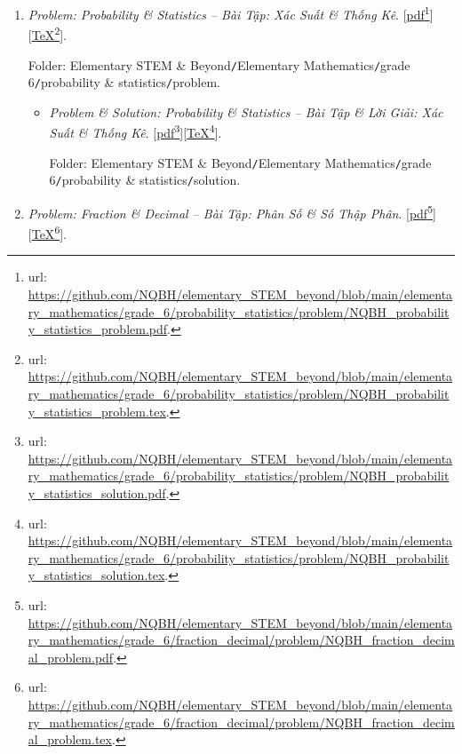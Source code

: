 \documentclass[12pt,twoside]{book}
\begin{document}
\begin{enumerate}
\begin{itemize}
		Folder: {\sf Elementary STEM \& Beyond{\tt/}Elementary Mathematics{\tt/}grade 6{\tt/}visual geometry{\tt/}solution}.
	\end{itemize}
	\item {\it Problem: Probability {\it\&} Statistics -- Bài Tập: Xác Suất {\it\&} Thống Kê}. [\href{https://github.com/NQBH/elementary_STEM_beyond/blob/main/elementary_mathematics/grade_6/probability_statistics/problem/NQBH_probability_statistics_problem.pdf}{pdf}\footnote{{\sc url}: \url{https://github.com/NQBH/elementary_STEM_beyond/blob/main/elementary_mathematics/grade_6/probability_statistics/problem/NQBH_probability_statistics_problem.pdf}.}][\href{https://github.com/NQBH/elementary_STEM_beyond/blob/main/elementary_mathematics/grade_6/probability_statistics/problem/NQBH_probability_statistics_problem.tex}{\TeX}\footnote{{\sc url}: \url{https://github.com/NQBH/elementary_STEM_beyond/blob/main/elementary_mathematics/grade_6/probability_statistics/problem/NQBH_probability_statistics_problem.tex}.}].
	
	Folder: {\sf Elementary STEM \& Beyond{\tt/}Elementary Mathematics{\tt/}grade 6{\tt/}probability \& statistics{\tt/}problem}.
	\begin{itemize}
		\item {\it Problem \& Solution: Probability {\it\&} Statistics -- Bài Tập \& Lời Giải: Xác Suất {\it\&} Thống Kê}. [\href{https://github.com/NQBH/elementary_STEM_beyond/blob/main/elementary_mathematics/grade_6/probability_statistics/problem/NQBH_probability_statistics_solution.pdf}{pdf}\footnote{{\sc url}: \url{https://github.com/NQBH/elementary_STEM_beyond/blob/main/elementary_mathematics/grade_6/probability_statistics/problem/NQBH_probability_statistics_solution.pdf}.}][\href{https://github.com/NQBH/elementary_STEM_beyond/blob/main/elementary_mathematics/grade_6/probability_statistics/problem/NQBH_probability_statistics_solution.tex}{\TeX}\footnote{{\sc url}: \url{https://github.com/NQBH/elementary_STEM_beyond/blob/main/elementary_mathematics/grade_6/probability_statistics/problem/NQBH_probability_statistics_solution.tex}.}].
		
		Folder: {\sf Elementary STEM \& Beyond{\tt/}Elementary Mathematics{\tt/}grade 6{\tt/}probability \& statistics{\tt/}solution}.
	\end{itemize}	
	\item {\it Problem: Fraction \& Decimal -- Bài Tập: Phân Số {\it\&} Số Thập Phân}. [\href{https://github.com/NQBH/elementary_STEM_beyond/blob/main/elementary_mathematics/grade_6/fraction_decimal/problem/NQBH_fraction_decimal_problem.pdf}{pdf}\footnote{{\sc url}: \url{https://github.com/NQBH/elementary_STEM_beyond/blob/main/elementary_mathematics/grade_6/fraction_decimal/problem/NQBH_fraction_decimal_problem.pdf}.}][\href{https://github.com/NQBH/elementary_STEM_beyond/blob/main/elementary_mathematics/grade_6/fraction_decimal/problem/NQBH_fraction_decimal_problem.tex}{\TeX}\footnote{{\sc url}: \url{https://github.com/NQBH/elementary_STEM_beyond/blob/main/elementary_mathematics/grade_6/fraction_decimal/problem/NQBH_fraction_decimal_problem.tex}.}].
	

\end{enumerate}
\end{document}
